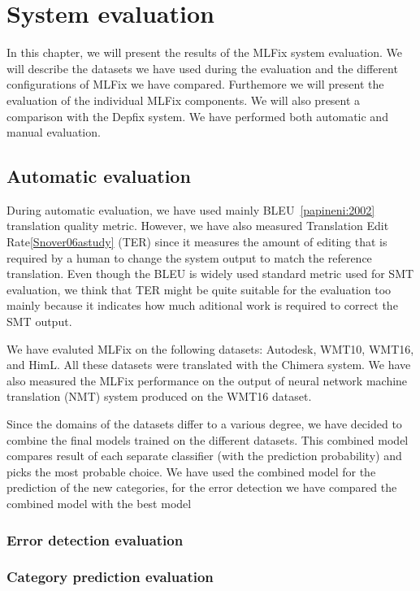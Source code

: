 \chapter{System evaluation}
\label{chap:eval}

In this chapter, we will present the results of the MLFix system evaluation.
We will describe the datasets we have used during the evaluation and the different
configurations of MLFix we have compared. Furthemore we will present the evaluation
of the individual MLFix components.
We will also present a comparison with the Depfix
system. We have performed both automatic and manual evaluation.

\section{Automatic evaluation}

During automatic evaluation, we have used mainly BLEU~\ref{papineni:2002} translation quality metric. However, we have also
measured Translation Edit Rate\ref{Snover06astudy} (TER) since it measures the amount of editing that is required by a human
to change the system output to match the reference translation. Even though the BLEU is widely used standard metric
used for SMT evaluation, we think that TER might be quite suitable for the evaluation too mainly because it indicates
how much aditional work is required to correct the SMT output.

We have evaluted MLFix on the following datasets: Autodesk, WMT10, WMT16, and HimL. All these datasets
were translated with the Chimera system. We have also measured the MLFix performance on the output of neural network
machine translation (NMT) system produced on the WMT16 dataset.

Since the domains of the datasets differ to a various degree, we have decided to combine the final models trained
on the different datasets. This combined model
compares result of each separate classifier (with the prediction probability) and picks the most probable choice.
We have used the combined model for the prediction of the new categories, for the error detection we have compared
the combined model with the best model


\subsection{Error detection evaluation}

\subsection{Category prediction evaluation}


